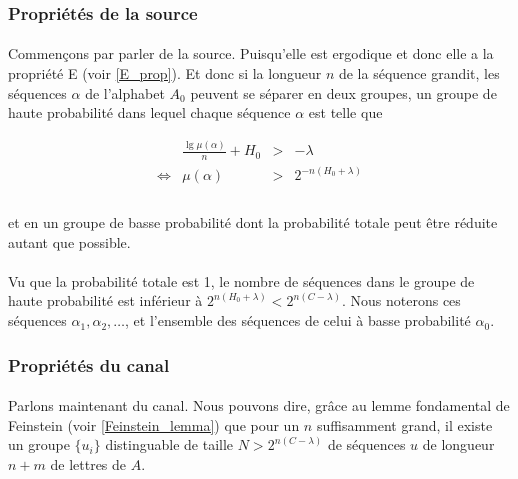\subsubsection*{Propriétés de la source}
	
	\paragraph{}
	Commençons par parler de la source. Puisqu'elle est ergodique et donc elle a la propriété E (voir \ref{E_prop}). 
	Et donc si la longueur $n$ de la séquence grandit, les séquences $\alpha$ de l'alphabet	$A_0$ peuvent se 
	séparer en deux groupes, un groupe de haute probabilité dans lequel chaque séquence $\alpha$ est telle que
	
	\[
		\begin{array}{crcl}
			&\frac{\lg \mu\left(\alpha\right)}{n}+H_0 &>& -\lambda\\
			\Leftrightarrow & \mu(\alpha) & > &2^{-n\left(H_0+\lambda\right)}\\
		\end{array}
	\]
	
	\paragraph{}
	et en un groupe de basse probabilité dont la probabilité totale peut être réduite autant que possible.

	\paragraph{}
	Vu que la probabilité totale est 1, le nombre de séquences dans le groupe de haute probabilité est inférieur à $2^{n(H_0+\lambda)}<2^{n(C-\lambda)}$.
	Nous noterons ces séquences $\alpha_1,\alpha_2,\dots$, et l'ensemble des séquences de celui à basse probabilité $\alpha_0$.
	
\subsubsection*{Propriétés du canal}
	
	\paragraph{}
	Parlons maintenant du canal. Nous pouvons dire, grâce au lemme fondamental de Feinstein (voir \ref{Feinstein_lemma}) 
	que pour un $n$ suffisamment grand, il existe un groupe $\{u_i\}$ distinguable de taille $N > 2^{n(C-\lambda)}$ de séquences $u$ de longueur $n+m$ de lettres 
	de $A$.
	
